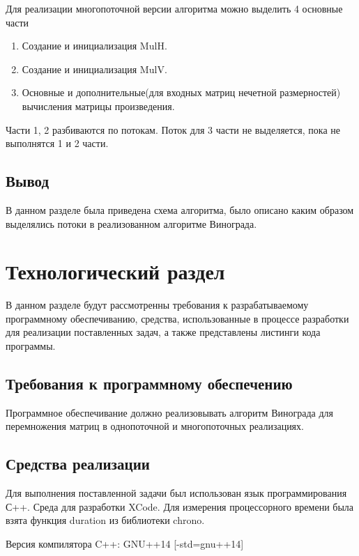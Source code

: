 \documentclass[12pt, a4paper]{report}
\begin{document}
	\newpage
	
	Для реализации многопоточной версии алгоритма можно выделить 4 основные части
	
	\begin{enumerate}
		\item Создание и инициализация MulH.
		\item Создание и инициализация MulV.
		\item Основные и дополнительные(для входных матриц нечетной размерностей) вычисления матрицы произведения.
	\end{enumerate}

	Части 1, 2 разбиваются по потокам. Поток для 3 части не выделяется, пока не выполнятся 1 и 2 части.

	
	\section{Вывод}
	В данном разделе была приведена схема алгоритма, было описано каким образом выделялись потоки в реализованном алгоритме Винограда.
	
	\newpage
	
	\chapter{Технологический раздел}
	\vspace{-0.5cm}В данном разделе будут рассмотренны требования к разрабатываемому программному обеспечиванию, средства, использованные в процессе разработки для реализации поставленных задач, а также представлены листинги кода программы.
	
	\section{Требования к программному обеспечению}
	Программное обеспечивание должно реализовывать алгоритм Винограда для перемножения матриц в однопоточной и многопоточных реализациях.
	
	\section{Средства реализации}
	\hspace{0.6cm}Для выполнения поставленной задачи был использован язык программирования С++. Среда для разработки XCode. Для измерения процессорного времени была взята функция duration из библиотеки chrono.
	
	\vspace{0.2cm}Версия компилятора C++: GNU++14 [-std=gnu++14]
	
\end{document}
